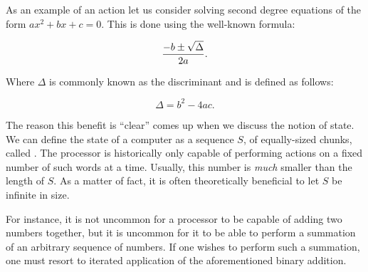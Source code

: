 


As an example of an action let us consider solving second degree equations of
the form $ax^2 + bx + c = 0$.  This is done using the well-known formula:

$${-b \pm \sqrt{\Delta} \over 2a}.$$

Where $\Delta$ is commonly known as the discriminant and is defined as follows:

$$ \Delta = b^2 - 4ac.$$

\newpage

The reason this benefit is ``clear'' comes up when we discuss the notion of
state. We can define the state of a computer as a sequence $S$, of
equally-sized chunks, called . The processor is historically only
capable of performing actions on a fixed number of such words at a time.
Usually, this number is \emph{much} smaller than the length of $S$. As a matter
of fact, it is often theoretically beneficial to let $S$ be infinite in size.

For instance, it is not uncommon for a processor to be capable of adding two
numbers together, but it is uncommon for it to be able to perform a summation
of an arbitrary sequence of numbers. If one wishes to perform such a summation,
one must resort to iterated application of the aforementioned binary addition. 

